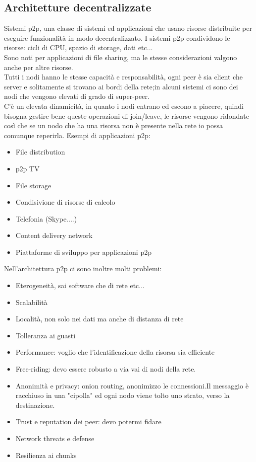 \documentclass[16px]{article}
\begin{document}
\subsection{Architetture decentralizzate}
Sistemi p2p, una classe di sistemi ed applicazioni che usano risorse distribuite per eseguire funzionalità in modo decentralizzato. I sistemi p2p condividono le risorse: cicli di CPU, spazio di storage, dati etc...\\ Sono noti per applicazioni di file sharing, ma le stesse considerazioni valgono anche per altre risorse.\\ Tutti i nodi hanno le stesse capacità e responsabilità, ogni peer è sia client che server e solitamente si trovano ai bordi della rete;in alcuni sistemi ci sono dei nodi che vengono elevati di grado di super-peer.\\ C'è un elevata dinamicità, in quanto i nodi entrano ed escono a piacere, quindi bisogna gestire bene queste operazioni di join/leave, le risorse vengono ridondate così che se un nodo che ha una risorsa non è presente nella rete io possa comunque reperirla. Esempi di applicazioni p2p:
\begin{itemize}
\item File distribution
\item p2p TV
\item File storage
\item Condisivione di risorse di calcolo
\item Telefonia (Skype....)
\item Content delivery network
\item Piattaforme di sviluppo per applicazioni p2p
\end{itemize}
Nell'architettura p2p ci sono inoltre molti problemi:
\begin{itemize}
\item Eterogeneità, sai software che di rete etc...
\item Scalabilità
\item Località, non solo nei dati ma anche di distanza di rete
\item Tolleranza ai guasti
\item Performance: voglio che l'identificazione della risorsa sia efficiente
\item Free-riding: devo essere robusto a via vai di nodi della rete.
\item Anonimità e privacy: onion routing, anonimizzo le connessioni.Il messaggio è racchiuso in una "cipolla" ed ogni nodo viene tolto uno strato, verso la destinazione.
\item Trust e reputation dei peer: devo potermi fidare
\item Network threats e defense
\item Resilienza ai chunks
\end{itemize}
\end{document}
